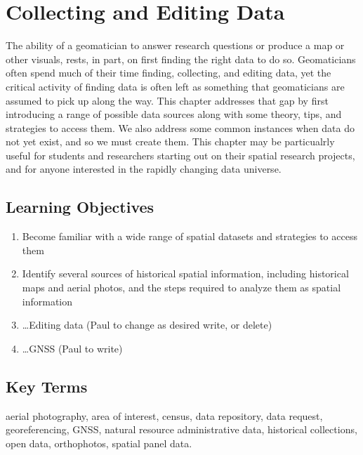 \documentclass[
]{book}
\providecommand{\tightlist}{%
  \setlength{\itemsep}{0pt}\setlength{\parskip}{0pt}}
\begin{document}
\hypertarget{collecting-and-editing-data}{%
\chapter{Collecting and Editing Data}\label{collecting-and-editing-data}}

The ability of a geomatician to answer research questions or produce a map or other visuals, rests, in part, on first finding the right data to do so. Geomaticians often spend much of their time finding, collecting, and editing data, yet the critical activity of finding data is often left as something that geomaticians are assumed to pick up along the way. This chapter addresses that gap by first introducing a range of possible data sources along with some theory, tips, and strategies to access them. We also address some common instances when data do not yet exist, and so we must create them. This chapter may be particualrly useful for students and researchers starting out on their spatial research projects, and for anyone interested in the rapidly changing data universe.

\hypertarget{learning-objectives-3}{%
\section*{Learning Objectives}\label{learning-objectives-3}}

\begin{enumerate}
\def\labelenumi{\arabic{enumi}.}
\tightlist
\item
  Become familiar with a wide range of spatial datasets and strategies to access them
\item
  Identify several sources of historical spatial information, including historical maps and aerial photos, and the steps required to analyze them as spatial information
\item
  \ldots Editing data (Paul to change as desired write, or delete)
\item
  \ldots GNSS (Paul to write)
\end{enumerate}

\hypertarget{key-terms-3}{%
\section*{Key Terms}\label{key-terms-3}}

aerial photography, area of interest, census, data repository, data request, georeferencing, GNSS, natural resource administrative data, historical collections, open data, orthophotos, spatial panel data.
\end{document}
